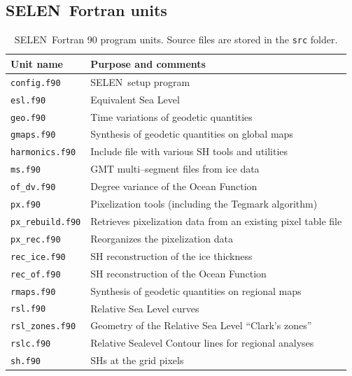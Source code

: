\documentclass[11pt,fleqn,a4paper,titlepage]{article}
\newcommand\selen{\textsf{SELEN~}}
\begin{document}
\subsection{\selen Fortran units}
%
%
\begin{table}[!hbp] 
\begin{center}
\caption[{\selen Fortran units}]{\selen Fortran 90 program units.  Source files are stored in the \texttt{src} folder.}
\begin{tabular}{ll}
\\
\hline
Unit name &  Purpose and comments  \\
\hline
\texttt{config.f90} &  \selen setup program  \\[-0.0em]
\texttt{esl.f90} & Equivalent Sea Level \\[-0.0em]
\texttt{geo.f90} & Time variations of geodetic quantities \\[-0.0em]
\texttt{gmaps.f90} & Synthesis of geodetic quantities on global maps \\[-0.0em]
\texttt{harmonics.f90} & Include file with various SH tools and utilities \\[-0.0em]
\texttt{ms.f90} & GMT multi--segment files from ice data \\[-0.0em]
\texttt{of\_dv.f90}& Degree variance of the Ocean Function \\[-0.0em]
\texttt{px.f90}& Pixelization tools (including the Tegmark algorithm)\\[-0.0em]
\texttt{px\_rebuild.f90}& Retrieves pixelization data from an existing pixel table file \\[-0.0em]
\texttt{px\_rec.f90}& Reorganizes the pixelization data \\[-0.0em]
\texttt{rec\_ice.f90}& SH reconstruction of the ice thickness \\[-0.0em]
\texttt{rec\_of.f90}& SH reconstruction of the Ocean Function  \\[-0.0em]
\texttt{rmaps.f90}& Synthesis of geodetic quantities on regional maps \\[-0.0em]
\texttt{rsl.f90}& Relative Sea Level curves \\[-0.0em]
\texttt{rsl\_zones.f90}& Geometry of the Relative Sea Level ``Clark's zones''  \\[-0.0em]
\texttt{rslc.f90}& Relative Sealevel Contour lines for regional analyses \\[-0.0em]
\texttt{sh.f90}& SHs at the grid pixels \\[-0.0em]

\end{tabular}
\end{center}
\end{table}
\end{document}
